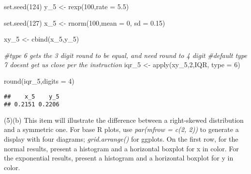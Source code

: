 \documentclass[
]{article}
\newenvironment{Shaded}{\begin{snugshade}}{\end{snugshade}}
\newcommand{\AttributeTok}[1]{\textcolor[rgb]{0.77,0.63,0.00}{#1}}
\newcommand{\CommentTok}[1]{\textcolor[rgb]{0.56,0.35,0.01}{\textit{#1}}}
\newcommand{\DecValTok}[1]{\textcolor[rgb]{0.00,0.00,0.81}{#1}}
\newcommand{\FloatTok}[1]{\textcolor[rgb]{0.00,0.00,0.81}{#1}}
\newcommand{\FunctionTok}[1]{\textcolor[rgb]{0.00,0.00,0.00}{#1}}
\newcommand{\NormalTok}[1]{#1}
\newcommand{\OtherTok}[1]{\textcolor[rgb]{0.56,0.35,0.01}{#1}}
\begin{document}
\begin{Shaded}
\begin{Highlighting}[]
\FunctionTok{set.seed}\NormalTok{(}\DecValTok{124}\NormalTok{)}
\NormalTok{y\_5 }\OtherTok{\textless{}{-}} \FunctionTok{rexp}\NormalTok{(}\DecValTok{100}\NormalTok{,}\AttributeTok{rate =} \FloatTok{5.5}\NormalTok{)}

\FunctionTok{set.seed}\NormalTok{(}\DecValTok{127}\NormalTok{)}
\NormalTok{x\_5 }\OtherTok{\textless{}{-}} \FunctionTok{rnorm}\NormalTok{(}\DecValTok{100}\NormalTok{,}\AttributeTok{mean =} \DecValTok{0}\NormalTok{, }\AttributeTok{sd =} \FloatTok{0.15}\NormalTok{)}

\NormalTok{xy\_5 }\OtherTok{\textless{}{-}} \FunctionTok{cbind}\NormalTok{(x\_5,y\_5)}

\CommentTok{\#type 6 gets the 3 digit round to be equal, and need round to 4 digit}
\CommentTok{\#default type 7 doesn\textquotesingle{}t get us close per the instruction}
\NormalTok{iqr\_5 }\OtherTok{\textless{}{-}} \FunctionTok{apply}\NormalTok{(xy\_5,}\DecValTok{2}\NormalTok{,IQR, }\AttributeTok{type =} \DecValTok{6}\NormalTok{)}

\FunctionTok{round}\NormalTok{(iqr\_5,}\AttributeTok{digits =} \DecValTok{4}\NormalTok{)}
\end{Highlighting}
\end{Shaded}

\begin{verbatim}
##    x_5    y_5 
## 0.2151 0.2206
\end{verbatim}

(5)(b) This item will illustrate the difference between a right-skewed
distribution and a symmetric one. For base R plots, use \emph{par(mfrow
= c(2, 2))} to generate a display with four diagrams;
\emph{grid.arrange()} for ggplots. On the first row, for the normal
results, present a histogram and a horizontal boxplot for x in color.
For the exponential results, present a histogram and a horizontal
boxplot for y in color.
\end{document}
